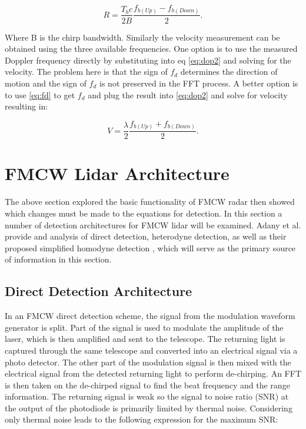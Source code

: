 \begin{equation}
\label{eq:FMCWchirpRange}
R=\frac{T_bc}{2B}\frac{f_{b(Up)}-f_{b(Down)}}{2}.
\end{equation}

Where B is the chirp bandwidth. Similarly the velocity measurement can be obtained using the three available frequencies.
One option is to use the measured 
Doppler frequency directly by substituting into eq \ref{eq:dop2} and solving for the velocity. The problem here is that the 
sign of $f_d$ determines the direction of motion and the sign of $f_d$ is not preserved in the FFT process. A better option 
is to use \ref{eq:fd} to get $f_d$ and plug the result into \ref{eq:dop2} and solve for velocity resulting in:

\begin{equation}
\label{eq:FMCWchirpVel}
V = \frac{\lambda}{2}\frac{f_{b(Up)}+f_{b(Down)}}{2}.
\end{equation}





\section{FMCW Lidar Architecture}
\label{sec:FMCWLidar}
The above section explored the basic functionality of FMCW radar then showed which changes must be made to the equations
for detection. In this section a number of detection architectures for FMCW lidar will be examined. Adany et al. provide
and analysis of direct detection, heterodyne detection, as well as their proposed simplified homodyne 
detection \cite{adany09,adany2007simplified}, which will serve as the primary source of information in this section.

\subsection{Direct Detection Architecture}
In an FMCW direct detection scheme, the signal from the modulation waveform generator is split. Part of the signal
is used to modulate the amplitude of the laser, which is then amplified and sent to the telescope. The 
returning light is captured through the same telescope and converted into an electrical signal via a
photo detector. The other part of the modulation signal is then mixed with the electrical signal from the
detected returning light to perform de-chirping. An FFT is then taken on the de-chirped signal to find 
the beat frequency and the range information. The returning signal is weak so the signal to noise ratio (SNR)
at the output of the photodiode is primarily limited by thermal noise. Considering only thermal noise leads
to the following expression for the maximum SNR:

